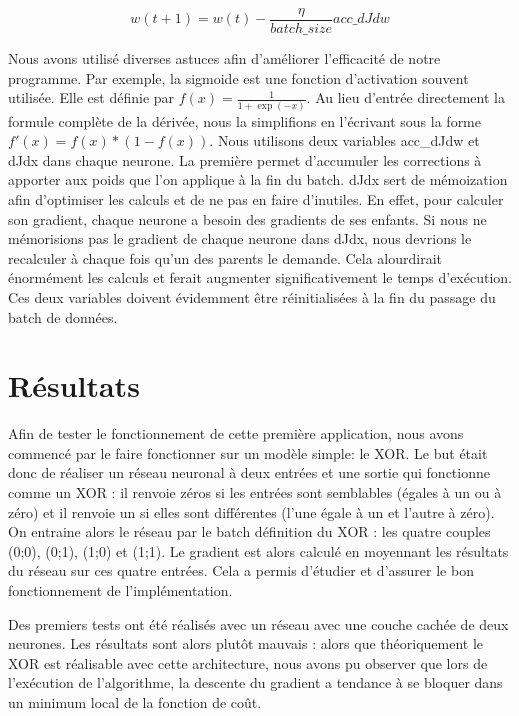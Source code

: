 \documentclass{report}
\theoremstyle{plain}
\theoremstyle{definition}
\theoremstyle{remark}
\begin{document}
\begin{equation}
w(t+1) = w(t) - \frac{\eta}{batch\_size}acc\_dJdw
\label{mise_a_jour_poids_batch}
\end{equation}

Nous avons utilisé diverses astuces afin d'améliorer l'efficacité de notre programme. Par exemple, la sigmoide est une fonction d'activation souvent utilisée. Elle est définie par $f(x) = \frac{1}{1+\exp(-x)}$. Au lieu d'entrée directement la formule complète de la dérivée, nous la simplifions en l'écrivant sous la forme $f'(x) = f(x) * (1 - f(x))$.
Nous utilisons deux variables acc\_dJdw et dJdx dans chaque neurone. La première permet d'accumuler les corrections à apporter aux poids que l'on applique à la fin du batch. dJdx sert de mémoization afin d'optimiser les calculs et de ne pas en faire d'inutiles. En effet, pour calculer son gradient, chaque neurone a besoin des gradients de ses enfants. Si nous ne mémorisions pas le gradient de chaque neurone dans dJdx, nous devrions le recalculer à chaque fois qu'un des parents le demande. Cela alourdirait énormément les calculs et ferait augmenter significativement le temps d'exécution. Ces deux variables doivent évidemment être réinitialisées à la fin du passage du batch de données.

\section{Résultats}

Afin de tester le fonctionnement de cette première application, nous avons commencé par le faire fonctionner sur un modèle simple: le XOR. Le but était donc de réaliser un réseau neuronal à deux entrées et une sortie qui fonctionne comme un XOR : il renvoie zéros si les entrées sont semblables (égales à un ou à zéro) et il renvoie un si elles sont différentes (l'une égale à un et l'autre à zéro). On entraine alors le réseau par le batch définition du XOR : les quatre couples (0;0), (0;1), (1;0) et (1;1). Le gradient est alors calculé en moyennant les résultats du réseau sur ces quatre entrées.
Cela a permis d'étudier et d'assurer le bon fonctionnement de l'implémentation.

Des premiers tests ont été réalisés avec un réseau avec une couche cachée de deux neurones. Les résultats sont alors plutôt mauvais : alors que théoriquement le XOR est réalisable avec cette architecture, nous avons pu observer que lors de l'exécution de l'algorithme, la descente du gradient a tendance à se bloquer dans un minimum local de la fonction de coût. 
\end{document}
